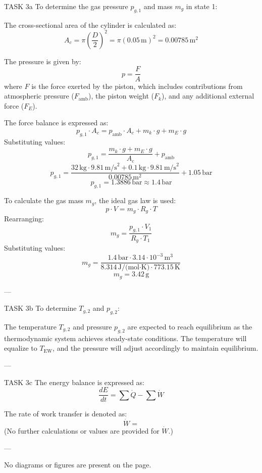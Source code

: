 TASK 3a  
To determine the gas pressure \( p_{g,1} \) and mass \( m_g \) in state 1:  

The cross-sectional area of the cylinder is calculated as:  
\[
A_c = \pi \left( \frac{D}{2} \right)^2 = \pi \left( 0.05 \, \text{m} \right)^2 = 0.00785 \, \text{m}^2
\]  

The pressure is given by:  
\[
p = \frac{F}{A}
\]  
where \( F \) is the force exerted by the piston, which includes contributions from atmospheric pressure (\( F_{\text{amb}} \)), the piston weight (\( F_k \)), and any additional external force (\( F_E \)).  

The force balance is expressed as:  
\[
p_{g,1} \cdot A_c = p_{\text{amb}} \cdot A_c + m_k \cdot g + m_E \cdot g
\]  
Substituting values:  
\[
p_{g,1} = \frac{m_k \cdot g + m_E \cdot g}{A_c} + p_{\text{amb}}
\]  
\[
p_{g,1} = \frac{32 \, \text{kg} \cdot 9.81 \, \text{m/s}^2 + 0.1 \, \text{kg} \cdot 9.81 \, \text{m/s}^2}{0.00785 \, \text{m}^2} + 1.05 \, \text{bar}
\]  
\[
p_{g,1} = 1.3886 \, \text{bar} \approx 1.4 \, \text{bar}
\]  

To calculate the gas mass \( m_g \), the ideal gas law is used:  
\[
p \cdot V = m_g \cdot R_g \cdot T
\]  
Rearranging:  
\[
m_g = \frac{p_{g,1} \cdot V_1}{R_g \cdot T_1}
\]  
Substituting values:  
\[
m_g = \frac{1.4 \, \text{bar} \cdot 3.14 \cdot 10^{-3} \, \text{m}^3}{8.314 \, \text{J/(mol·K)} \cdot 773.15 \, \text{K}}
\]  
\[
m_g = 3.42 \, \text{g}
\]  

---

TASK 3b  
To determine \( T_{g,2} \) and \( p_{g,2} \):  

The temperature \( T_{g,2} \) and pressure \( p_{g,2} \) are expected to reach equilibrium as the thermodynamic system achieves steady-state conditions. The temperature will equalize to \( T_{\text{EW}} \), and the pressure will adjust accordingly to maintain equilibrium.  

---

TASK 3c  
The energy balance is expressed as:  
\[
\frac{dE}{dt} = \sum \dot{Q} - \sum \dot{W}
\]  

The rate of work transfer is denoted as:  
\[
\dot{W} = 
\]  
(No further calculations or values are provided for \( \dot{W} \).)  

---

No diagrams or figures are present on the page.